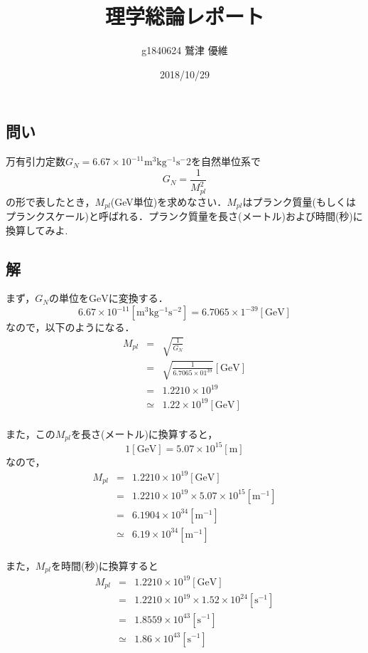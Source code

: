 \documentclass[10pt]{ujarticle}
\title{理学総論レポート}
\author{g1840624 鷲津 優維}
\date{2018/10/29}
\begin{document}
\maketitle
\section{}
\subsection{問い}
万有引力定数$G_N = 6.67×10^{-11} \mathrm{m^3 kg^{-1} s{^-2}}$を自然単位系で
\[
G_N = \frac{1}{M^2_{pl}}
\]
の形で表したとき，$M_{pl}$(GeV単位)を求めなさい．$M_{pl}$はプランク質量(もしくはプランクスケール)と呼ばれる．プランク質量を長さ(メートル)および時間(秒)に換算してみよ.

\subsection{解}
まず，$G_N$の単位を$\mathrm{GeV}$に変換する．
\[
6.67 \times 10^{-11} \mathrm{[m^3 kg^{-1} s^{-2}]} = 6.7065 ×1^{-39} \mathrm{[GeV]} 
\]
なので，以下のようになる．
\begin{eqnarray*}
M_{pl} &=& \sqrt{\frac{1}{G_N}} \\
&=& \sqrt{\frac{1}{6.7065 × 01^{39}}} \mathrm{[GeV]}\\
&=& 1.2210 \times 10^{19} \\
&\simeq& 1.22 \times 10^{19} \mathrm{[GeV]} \\
\end{eqnarray*}

また，この$M_{pl}$を長さ(メートル)に換算すると，
\[
1 \mathrm{[GeV]} = 5.07 \times 10^{15} \mathrm{[m]}
\]
なので，
\begin{eqnarray*}
  M_{pl} &=& 1.2210 \times 10^{19} \mathrm {[GeV]}\\
  &=& 1.2210 \times 10^{19} \times 5.07 \times 10^{15} \mathrm{[m^{-1}]} \\
  &=& 6.1904 \times 10^{34} \mathrm{[m^{-1}]} \\
  &\simeq& 6.19 \times 10^{34} \mathrm{[m^{-1}]} \\
\end{eqnarray*}

また，$M_{pl}$を時間(秒)に換算すると
\begin{eqnarray*}
  M_{pl} &=& 1.2210 \times 10^{19} \mathrm{[GeV]} \\
  &=& 1.2210 \times 10^{19} \times 1.52 \times 10^{24} \mathrm{[s^{-1}]} \\
  &=& 1.8559 \times 10^{43} \mathrm{[s^{-1}]} \\
  &\simeq& 1.86 \times 10^{43} \mathrm{[s^{-1}]} \\
\end{eqnarray*}
\end{document}
